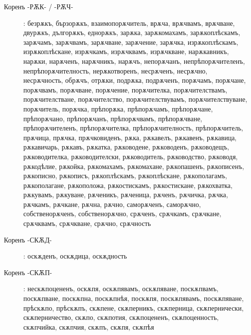 \documentclass{article}
\begin{document}
\begin{description}
	\item[Коренъ -РѪК- / -РѪЧ-]: безрѫкъ, бързорѫкъ, взаимопорѫчитель, врѫча, врѫчвамъ, врѫчване, двурѫкъ, дългорѫкъ, еднорѫкъ, зарѫка, зарѫкомахамъ, зарѫкоплѣскамъ, зарѫчамъ, зарѫчвамъ, зарѫчване, зарѫчение, зарѫчка, изрѫкоплѣскамъ, изрѫкоплѣскане, изрѫчкамъ, изрѫчквамъ, изрѫчкване, нарѫкавникъ, нарѫки, нарѫченъ, нарѫчникъ, нарѫчъ, непорѫчанъ, непрѣпорѫчителенъ, непрѣпорѫчителность, нерѫкотворенъ, несрѫченъ, несрѫчно, несрѫчность, обрѫчъ, отрѫки, подрѫка, подрѫченъ, порѫчамъ, порѫчане, порѫчвамъ, порѫчване, порѫчение, порѫчителка, порѫчителствамъ, порѫчителстване, порѫчителство, порѫчителствувамъ, порѫчителствуване, порѫчитель, порѫчка, прѣпорѫка, прѣпорѫчамъ, прѣпорѫчане, прѣпорѫчано, прѣпорѫчанъ, прѣпорѫчвамъ, прѣпорѫчване, прѣпорѫчителенъ, прѣпорѫчителка, прѣпорѫчителность, прѣпорѫчитель, прѫчица, прѫчка, прѫчковиденъ, рѫка, рѫкавелъ, рѫкавенъ, рѫкавица, рѫкавичарь, рѫкавъ, рѫкатка, рѫководене, рѫководенъ, рѫководещъ, рѫководителка, рѫководителски, рѫководитель, рѫководство, рѫководя, рѫкодѣлие, рѫкойка, рѫкомахамъ, рѫкомахане, рѫкопашенъ, рѫкописенъ, рѫкописно, рѫкописъ, рѫкоплѣскамъ, рѫкоплѣскане, рѫкополагамъ, рѫкополагане, рѫкоположа, рѫкостискамъ, рѫкостискане, рѫкохватка, рѫкувамъ, рѫкуване, рѫченикъ, рѫченица, рѫченъ, рѫчичка, рѫчка, рѫчкамъ, рѫчкане, рѫчна, рѫчно, саморѫченъ, саморѫчно, собственорѫченъ, собственорѫчно, срѫченъ, срѫчкамъ, срѫчкане, срѫчквамъ, срѫчкване, срѫчно, срѫчность
	
	\item[Коренъ -СКѪД-]: оскѫденъ, оскѫдица, оскѫдность
	
	\item[Коренъ -СКѪП-]: нескѫпоцененъ, оскѫпя, оскѫпявамъ, оскѫпяване, поскѫпвамъ, поскѫпване, поскѫпна, поскѫпнѣя, поскѫпя, поскѫпявамъ, поскѫпяване, прѣскѫпо, прѣскѫпъ,
	 скѫпене, скѫперникъ, скѫперница, скѫпернически, скѫперничество, скѫпо, скѫпотия, скѫпоцененъ, скѫпоценность, скѫпчийка, скѫпчия, скѫпъ, скѫпя, скѫпѣя
	

\end{description}
\end{document}
